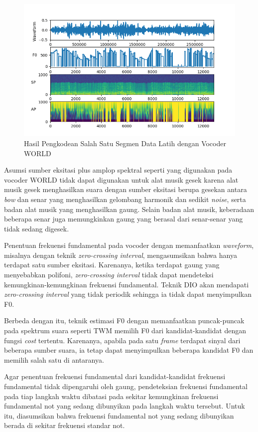 \begin{figure}[htbp]
    \centering
    \includegraphics[width=\textwidth]{resources/Analisis_vocoder.png}
    \caption{Hasil Pengkodean Salah Satu Segmen Data Latih dengan Vocoder WORLD} \label{vocoderanalysisresultexample}
\end{figure}

Asumsi sumber eksitasi plus amplop spektral seperti yang digunakan pada vocoder WORLD tidak dapat digunakan untuk alat musik gesek karena alat musik gesek menghasilkan suara dengan sumber eksitasi berupa gesekan antara \textit{bow} dan senar yang menghasilkan gelombang harmonik dan sedikit \textit{noise}, serta badan alat musik yang menghasilkan gaung. Selain badan alat musik, keberadaan beberapa senar juga memungkinkan gaung yang berasal dari senar-senar yang tidak sedang digesek.

Penentuan frekuensi fundamental pada vocoder dengan memanfaatkan \textit{waveform}, misalnya dengan teknik \textit{zero-crossing interval}, mengasumsikan bahwa hanya terdapat satu sumber eksitasi. Karenanya, ketika terdapat gaung yang menyebabkan polifoni, \textit{zero-crossing interval} tidak dapat mendeteksi kemungkinan-kemungkinan frekuensi fundamental. Teknik DIO akan mendapati \textit{zero-crossing interval} yang tidak periodik sehingga ia tidak dapat menyimpulkan F0.

Berbeda dengan itu, teknik estimasi F0 dengan memanfaatkan puncak-puncak pada spektrum suara seperti TWM memilih F0 dari kandidat-kandidat dengan fungsi \textit{cost} tertentu. Karenanya, apabila pada satu \textit{frame} terdapat sinyal dari beberapa sumber suara, ia tetap dapat menyimpulkan beberapa kandidat F0 dan memilih salah satu di antaranya.

Agar penentuan frekuensi fundamental dari kandidat-kandidat frekuensi fundamental tidak dipengaruhi oleh gaung, pendeteksian frekuensi fundamental pada tiap langkah waktu dibatasi pada sekitar kemungkinan frekuensi fundamental not yang sedang dibunyikan pada langkah waktu tersebut. Untuk itu, diasumsikan bahwa frekuensi fundamental not yang sedang dibunyikan berada di sekitar frekuensi standar not.

